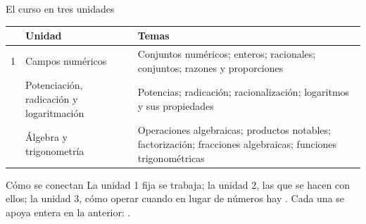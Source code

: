 \documentclass[aspectratio=169,10pt]{beamer}
\begin{document}
\begin{frame}{El curso en tres unidades}
  \scriptsize
  \begin{center}
  \begin{tabular}{@{}p{1.2cm}p{4.4cm}p{6.2cm}@{}}
    \toprule
    & \textbf{Unidad} & \textbf{Temas} \\
    \midrule
    1 & Campos numéricos &
      Conjuntos numéricos; enteros; racionales; conjuntos; razones y
      proporciones \\
    \addlinespace
    2 & Potenciación, radicación y logaritmación &
      Potencias; radicación; racionalización; logaritmos y sus propiedades \\
    \addlinespace
    3 & Álgebra y trigonometría &
      Operaciones algebraicas; productos notables; factorización; fracciones
      algebraicas; funciones trigonométricas \\
    \bottomrule
  \end{tabular}
  \end{center}

  \vspace{0.15cm}
  \begin{alertblock}{Cómo se conectan}
    \scriptsize
    La unidad 1 fija  se trabaja; la unidad 2, las
     que se hacen con ellos; la unidad 3, cómo operar
    cuando en lugar de números hay . Cada una se apoya
    entera en la anterior: .
  \end{alertblock}
\end{frame}
\end{document}
